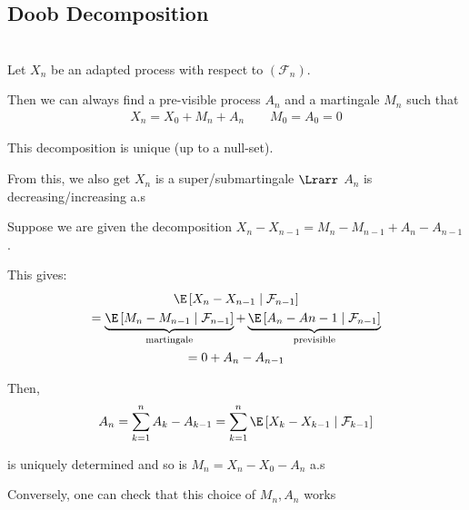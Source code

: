 \subsection{Doob Decomposition}\hfill\\
\noindent Let $X_n$ be an adapted process with respect to $(\mathcal{F}_n)$.\par
\noindent Then we can always find a pre-visible process $A_n$ and a martingale $M_n$ such that
\begin{equation*}
  \begin{gathered}
    X_n = X_0+M_n +A_n\qquad M_0=A_0=0
  \end{gathered}
\end{equation*}\par
\noindent This decomposition is unique (up to a null-set).\par
\noindent From this, we also get $X_n$ is a super/submartingale $\Lrarr$ $A_n$ is decreasing/increasing a.s
\par\bigskip
\begin{prf}[]{}
  Suppose we are given the decomposition $X_n-X_{n-1} = M_n-M_{n-1}+A_n-A_{n-1}$.\par
  \noindent This gives:
  \begin{equation*}
    \begin{gathered}
      \E\left[X_n-X_{n-1}\mid\mathcal{F}_{n-1}\right]\\
      =\underbrace{\E\left[M_n-M_{n-1}\mid\mathcal{F}_{n-1}\right]}_{\substack{\text{martingale}}}+\underbrace{\E\left[A_n-A{n-1}\mid\mathcal{F}_{n-1}\right]}_{\substack{\text{previsible}}}\\
      = 0 + A_{n}-A_{n-1}
    \end{gathered}
  \end{equation*}\par
  \noindent Then, 
  \begin{equation*}
    \begin{gathered}
      A_n = \sum_{k=1}^{n}A_k-A_{k-1} = \sum_{k=1}^{n}\E\left[X_k-X_{k-1}\mid\mathcal{F}_{k-1}\right]
    \end{gathered}
  \end{equation*}\par
  \noindent is uniquely determined and so is $M_n = X_n-X_0-A_n$ a.s\par
  \noindent Conversely, one can check that this choice of $M_n,A_n$ works
\end{prf}
